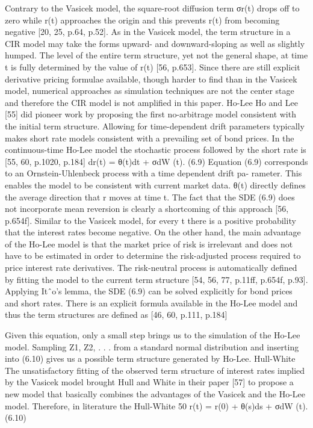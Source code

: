 Contrary to the Vasicek model, the square-root diffusion term σr(t) drops off to zero while r(t) approaches the origin and this prevents r(t) from becoming negative [20, 25, p.64, p.52]. As in the Vasicek model, the term structure in a CIR model may take the forms upward- and downward-sloping as well as slightly humped. The level of the entire term structure, yet not the general shape, at time t is fully determined by the value of r(t) [56, p.653].
Since there are still explicit derivative pricing formulae available, though harder to find than in the Vasicek model, numerical approaches as simulation techniques are not the center stage and therefore the CIR model is not amplified in this paper.
Ho-Lee
Ho and Lee [55] did pioneer work by proposing the first no-arbitrage model consistent with the initial term structure. Allowing for time-dependent drift parameters typically makes short rate models consistent with a prevailing set of bond prices. In the continuous-time Ho-Lee model the stochastic process followed by the short rate is [55, 60, p.1020, p.184]
dr(t) = θ(t)dt + σdW (t). (6.9)
Equation (6.9) corresponds to an Ornstein-Uhlenbeck process with a time dependent drift pa- rameter. This enables the model to be consistent with current market data. θ(t) directly defines the average direction that r moves at time t. The fact that the SDE (6.9) does not incorporate mean reversion is clearly a shortcoming of this approach [56, p.654f]. Similar to the Vasicek model, for every t there is a positive probability that the interest rates become negative. On the other hand, the main advantage of the Ho-Lee model is that the market price of risk is irrelevant and does not have to be estimated in order to determine the risk-adjusted process required to price interest rate derivatives. The risk-neutral process is automatically defined by fitting the model to the current term structure [54, 56, 77, p.11ff, p.654f, p.93].
Applying Itˆo’s lemma, the SDE (6.9) can be solved explicitly for bond prices and short rates. There is an explicit formula available in the Ho-Lee model and thus the term structures are defined as [46, 60, p.111, p.184]

Given this equation, only a small step brings us to the simulation of the Ho-Lee model. Sampling Z1, Z2, . . . from a standard normal distribution and inserting into (6.10) gives us a possible term structure generated by Ho-Lee.
Hull-White
The unsatisfactory fitting of the observed term structure of interest rates implied by the Vasicek model brought Hull and White in their paper [57] to propose a new model that basically combines the advantages of the Vasicek and the Ho-Lee model. Therefore, in literature the Hull-White
50
r(t) = r(0) +
θ(s)ds + σdW (t). (6.10)

